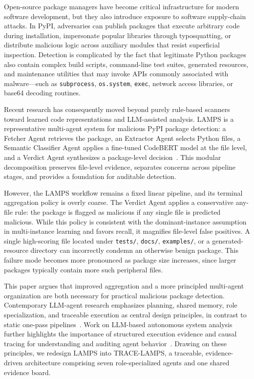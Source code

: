 \documentclass[conference,a4paper]{IEEEtran}
\newcommand{\tracelamps}{TRACE-LAMPS}
\newcommand{\codebert}{CodeBERT}
\begin{document}
Open-source package managers have become critical infrastructure for modern software
development, but they also introduce exposure to software supply-chain attacks. In PyPI,
adversaries can publish packages that execute arbitrary code during installation,
impersonate popular libraries through typosquatting, or distribute malicious logic across
auxiliary modules that resist superficial inspection. Detection is complicated by the fact
that legitimate Python packages also contain complex build scripts, command-line test
suites, generated resources, and maintenance utilities that may invoke APIs commonly
associated with malware---such as \texttt{subprocess}, \texttt{os.system}, \texttt{exec},
network access libraries, or base64 decoding routines.

Recent research has consequently moved beyond purely rule-based scanners toward learned
code representations and LLM-assisted analysis. LAMPS is a representative multi-agent
system for malicious PyPI package detection: a Fetcher Agent retrieves the package, an
Extractor Agent selects Python files, a Semantic Classifier Agent applies a fine-tuned
\codebert{} model at the file level, and a Verdict Agent synthesizes a package-level
decision~\cite{lamps}. This modular decomposition preserves file-level evidence,
separates concerns across pipeline stages, and provides a foundation for auditable
detection.

However, the LAMPS workflow remains a fixed linear pipeline, and its terminal
aggregation policy is overly coarse. The Verdict Agent applies a conservative any-file
rule: the package is flagged as malicious if any single file is predicted malicious.
While this policy is consistent with the dominant-instance assumption in multi-instance
learning and favors recall, it magnifies file-level false positives. A single high-scoring
file located under \texttt{tests/}, \texttt{docs/}, \texttt{examples/}, or a
generated-resource directory can incorrectly condemn an otherwise benign package. This
failure mode becomes more pronounced as package size increases, since larger packages
typically contain more such peripheral files.

This paper argues that improved aggregation and a more principled multi-agent organization
are both necessary for practical malicious package detection. Contemporary LLM-agent
research emphasizes planning, shared memory, role specialization, and traceable execution
as central design principles, in contrast to static one-pass pipelines~\cite{wang2024agents,he2025lma}. Work on LLM-based autonomous system analysis further
highlights the importance of structured execution evidence and causal tracing for
understanding and auditing agent behavior~\cite{agentlens}. Drawing on these principles,
we redesign LAMPS into \tracelamps{}, a traceable, evidence-driven architecture
comprising seven role-specialized agents and one shared evidence board.
\end{document}
